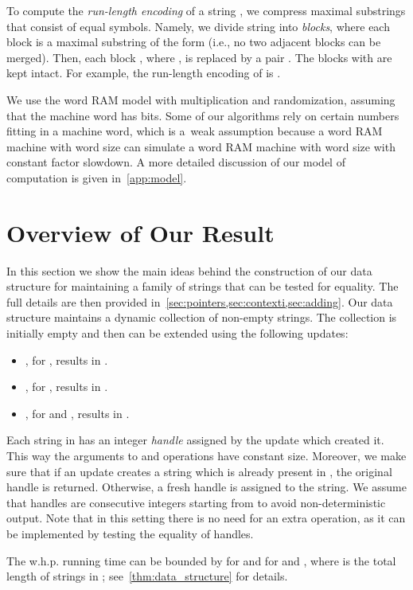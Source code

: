 \documentclass[a4paper]{article}
\theoremstyle{remark}
\begin{document}
To compute the \emph{run-length encoding} of a string , we compress maximal substrings that consist of equal symbols.
Namely, we divide  string into \emph{blocks}, where each block is a maximal substring of the form  (i.e., no two adjacent blocks can be merged).
Then, each block , where , is replaced by a pair .
The blocks with  are kept intact.
For example, the run-length encoding of  is .

We use the word RAM model with multiplication and randomization, assuming that the machine word has  bits.
Some of our algorithms rely on certain numbers fitting in a machine word, which is a~weak
assumption because a word RAM machine with word size  can simulate a word RAM machine
with word size  with constant factor slowdown.
A more detailed discussion of our model of computation is given in~\cref{app:model}.

\section{Overview of Our Result}\label{sec:collection}
In this section we show the main ideas behind the construction of our data structure
for maintaining a family of strings that can be tested for equality.
The full details are then provided in~\cref{sec:pointers,sec:contexti,sec:adding}.
Our data structure maintains a dynamic collection  of non-empty strings.
The collection is initially empty and then can be extended using the following updates:
\begin{itemize}
  \item , for , results in .
   \item , for , results in .
  \item , for  and , results in
    .
\end{itemize}
Each string in  has an integer \emph{handle} assigned by the update which created it.
This way the arguments to  and  operations have constant size.
Moreover, we make sure that if an update creates a string which is already present in , the original handle is returned.
Otherwise, a fresh handle is assigned to the string. We assume that handles are consecutive integers starting from 
to avoid non-deterministic output.
Note that in this setting there is no need for an extra  operation, as it can be implemented by
testing the equality of handles.

The w.h.p. running time can be bounded by  for  and  for  and ,
where  is the total length of strings in ; see~\cref{thm:data_structure} for details.
\end{document}
